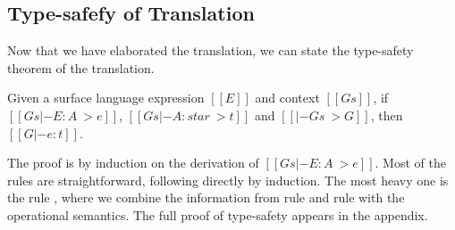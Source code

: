 \subsection{Type-safefy of Translation}

Now that we have elaborated the translation, we can state the
type-safety theorem of the translation.

\begin{thm}
Given a surface language expression $[[E]]$ and context $[[Gs]]$, 
if $[[Gs |- E:A ~> e]]$, $[[Gs |- A:star ~> t]]$ and $[[|- Gs ~> G]]$, then
$[[G |- e:t]]$.
\end{thm}

The proof is by induction on the derivation of $[[Gs |- E : A ~> e]]$.
Most of the rules are straightforward, following directly by
induction. The most heavy one is the rule , where we
combine the information from rule  and rule
 with the operational semantics. The full proof of
type-safety appears in the appendix.

